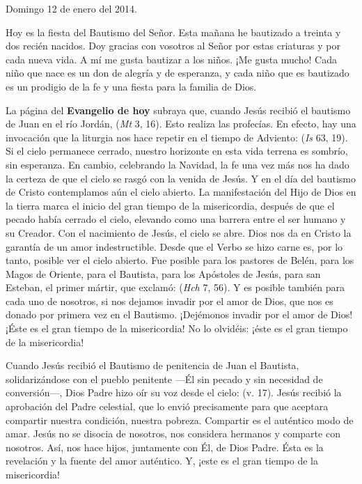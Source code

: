 \begin{body}
\begin{body}
{Domingo 12 de enero del 2014.

Hoy es la fiesta del Bautismo del Señor. Esta mañana he bautizado a treinta y dos recién nacidos. Doy gracias con vosotros al Señor por estas criaturas y por cada nueva vida. A mí me gusta bautizar a los niños. ¡Me gusta mucho! Cada niño que nace es un don de alegría y de esperanza, y cada niño que es bautizado es un prodigio de la fe y una fiesta para la familia de Dios.

La página del \textbf{Evangelio de hoy} subraya que, cuando Jesús recibió el bautismo de Juan en el río Jordán,  (\emph{Mt} 3, 16). Esto realiza las profecías. En efecto, hay una invocación que la liturgia nos hace repetir en el tiempo de Adviento:  (\emph{Is} 63, 19). Si el cielo permanece cerrado, nuestro horizonte en esta vida terrena es sombrío, sin esperanza. En cambio, celebrando la Navidad, la fe una vez más nos ha dado la certeza de que el cielo se rasgó con la venida de Jesús. Y en el día del bautismo de Cristo contemplamos aún el cielo abierto. La manifestación del Hijo de Dios en la tierra marca el inicio del gran tiempo de la misericordia, después de que el pecado había cerrado el cielo, elevando como una barrera entre el ser humano y su Creador. Con el nacimiento de Jesús, el cielo se abre. Dios nos da en Cristo la garantía de un amor indestructible. Desde que el Verbo se hizo carne es, por lo tanto, posible ver el cielo abierto. Fue posible para los pastores de Belén, para los Magos de Oriente, para el Bautista, para los Apóstoles de Jesús, para san Esteban, el primer mártir, que exclamó:  (\emph{Hch} 7, 56). Y es posible también para cada uno de nosotros, si nos dejamos invadir por el amor de Dios, que nos es donado por primera vez en el Bautismo. ¡Dejémonos invadir por el amor de Dios! ¡Éste es el gran tiempo de la misericordia! No lo olvidéis: ¡éste es el gran tiempo de la misericordia!

Cuando Jesús recibió el Bautismo de penitencia de Juan el Bautista, solidarizándose con el pueblo penitente ---Él sin pecado y sin necesidad de conversión---, Dios Padre hizo oír su voz desde el cielo:  (v. 17). Jesús recibió la aprobación del Padre celestial, que lo envió precisamente para que aceptara compartir nuestra condición, nuestra pobreza. Compartir es el auténtico modo de amar. Jesús no se disocia de nosotros, nos considera hermanos y comparte con nosotros. Así, nos hace hijos, juntamente con Él, de Dios Padre. Ésta es la revelación y la fuente del amor auténtico. Y, ¡este es el gran tiempo de la misericordia!

}
\end{body}
\end{body}
